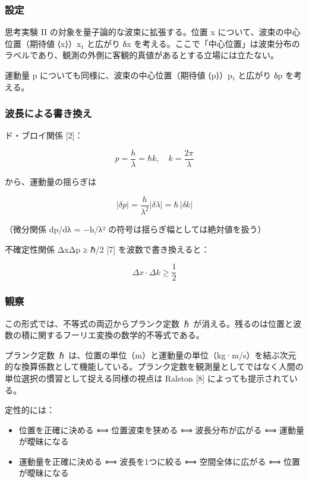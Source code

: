 \documentclass[
]{ltjsarticle}
\providecommand{\tightlist}{%
  \setlength{\itemsep}{0pt}\setlength{\parskip}{0pt}}
\begin{document}
\subsubsection{設定}\label{ux8a2dux5b9a-2}

思考実験 II の対象を量子論的な波束に拡張する。位置 x
について、波束の中心位置（期待値 ⟨x⟩）x₁ と広がり δx
を考える。ここで「中心位置」は波束分布のラベルであり、観測の外側に客観的真値があるとする立場には立たない。

運動量 p についても同様に、波束の中心位置（期待値 ⟨p⟩）p₁ と広がり δp
を考える。

\subsubsection{波長による書き換え}\label{ux6ce2ux9577ux306bux3088ux308bux66f8ux304dux63dbux3048}

ド・ブロイ関係 {[}2{]}：

\[p = \frac{h}{\lambda} = \hbar k, \quad k = \frac{2\pi}{\lambda}\]

から、運動量の揺らぎは

\[|\delta p| = \frac{h}{\lambda^2}|\delta\lambda| = \hbar \, |\delta k|\]

（微分関係 dp/dλ = −h/λ² の符号は揺らぎ幅としては絶対値を扱う）

不確定性関係 ΔxΔp ≥ ℏ/2 {[}7{]} を波数で書き換えると：

\[\Delta x \cdot \Delta k \geq \frac{1}{2}\]

\subsubsection{観察}\label{ux89b3ux5bdf}

この形式では、不等式の両辺からプランク定数 ℏ
が消える。残るのは位置と波数の積に関するフーリエ変換の数学的不等式である。

プランク定数 ℏ
は、位置の単位（m）と運動量の単位（kg·m/s）を結ぶ次元的な換算係数として機能している。プランク定数を観測量としてではなく人間の単位選択の慣習として捉える同様の視点は
Ralston {[}8{]} によっても提示されている。

定性的には：

\begin{itemize}
\tightlist
\item
  位置を正確に決める ⟺ 位置波束を狭める ⟺ 波長分布が広がる ⟺
  運動量が曖昧になる
\item
  運動量を正確に決める ⟺ 波長を1つに絞る ⟺ 空間全体に広がる ⟺
  位置が曖昧になる
\end{itemize}
\end{document}
